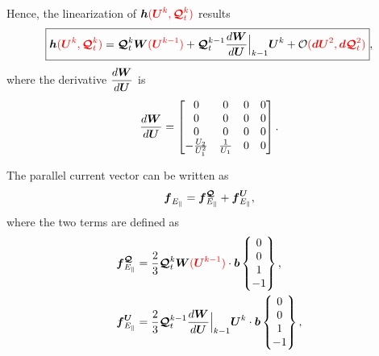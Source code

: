 \documentclass[a4paper,10pt]{article}
\newcommand{\bm}[1]{\text{\boldmath$#1$\unboldmath}}
\renewcommand{\b}{\bm{b}}
\newcommand{\DiscFunc}[1]{\bm{#1}}
\newcommand{\SecOrdTens}[1]{\bm{\mathcal{#1}}}
\renewcommand{\u}{\DiscFunc{U}}
\newcommand{\G}{\SecOrdTens{Q}}
\newcommand{\Gt}{\G_t}
\newcommand{\W}{\DiscFunc{W}}
\newcommand{\fo}[1]{{ \color{red} ( #1 )\color{black} }} %
\begin{document}
Hence, the linearization of $\bm{h}\fo{\u^k,\Gt^k} $ results
\[
\boxed{
 \bm{h}\fo{\u^k,\Gt^k} = \Gt^{k} \W\fo{\u^{k-1}} +\Gt^{k-1}\dfrac{d\W}{d\u}\Big|_{k-1}\u^k+ \mathcal{O}\fo{\bm{dU}^2,\bm{d}\Gt^2}
 },
\]
where the derivative $\dfrac{d\W}{d\u}$ is
\begin{equation*}
 \dfrac{d\W}{d\u} = \begin{bmatrix}
       0               &          0           &          0   &   0 \\
       0               &          0           &          0   &   0 \\
       0               &          0           &          0   &   0 \\
-\frac{U_2}{U_1^2}     &  \frac{1}{U_1}   &          0   &   0 
                        \end{bmatrix}.
\end{equation*}

The parallel current vector can be written as
\[
 \bm{f}_{E_{\parallel}} = \bm{f}_{E_{\parallel}}^\G+\bm{f}_{E_{\parallel}}^\u,
\]
where the two terms are defined as
\begin{align*}
 \bm{f}_{E_{\parallel}}^\G &= \frac{2}{3} \Gt^{k} \W\fo{\u^{k-1}}\cdot \b \begin{Bmatrix}
                     0 \\
                     0\\
                     1\\
                    -1\\
       \end{Bmatrix}, \\
 \bm{f}_{E_{\parallel}}^\u &= \frac{2}{3} \Gt^{k-1}\dfrac{d\W}{d\u}\Big|_{k-1}\u^k \cdot \b \begin{Bmatrix}
                     0 \\
                     0\\
                     1\\
                    -1\\
       \end{Bmatrix}, 
\end{align*}
\end{document}
